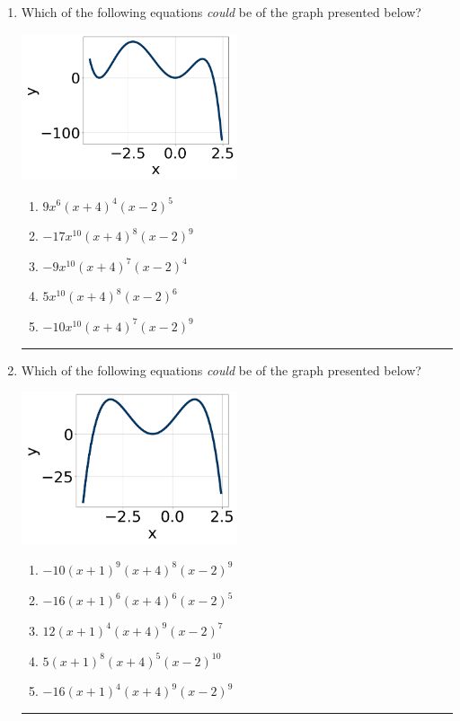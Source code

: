 \documentclass[14pt]{extbook}
\newcommand{\litem}[1]{\item#1\hspace*{-1cm}\rule{\textwidth}{0.4pt}}
\begin{document}
\begin{enumerate}
{\begin{enumerate}[label=\Alph*.]
\end{enumerate} }
\litem{
Which of the following equations \textit{could} be of the graph presented below?
\begin{center}
    \includegraphics[width=0.5\textwidth]{../Figures/polyGraphToFunctionCopyC.png}
\end{center}
\begin{enumerate}[label=\Alph*.]
\item \( 9x^{6} (x + 4)^{4} (x - 2)^{5} \)
\item \( -17x^{10} (x + 4)^{8} (x - 2)^{9} \)
\item \( -9x^{10} (x + 4)^{7} (x - 2)^{4} \)
\item \( 5x^{10} (x + 4)^{8} (x - 2)^{6} \)
\item \( -10x^{10} (x + 4)^{7} (x - 2)^{9} \)

\end{enumerate} }
\litem{
Which of the following equations \textit{could} be of the graph presented below?
\begin{center}
    \includegraphics[width=0.5\textwidth]{../Figures/polyGraphToFunctionC.png}
\end{center}
\begin{enumerate}[label=\Alph*.]
\item \( -10(x + 1)^{9} (x + 4)^{8} (x - 2)^{9} \)
\item \( -16(x + 1)^{6} (x + 4)^{6} (x - 2)^{5} \)
\item \( 12(x + 1)^{4} (x + 4)^{9} (x - 2)^{7} \)
\item \( 5(x + 1)^{8} (x + 4)^{5} (x - 2)^{10} \)
\item \( -16(x + 1)^{4} (x + 4)^{9} (x - 2)^{9} \)


\end{enumerate}}
\end{enumerate}
\end{document}
